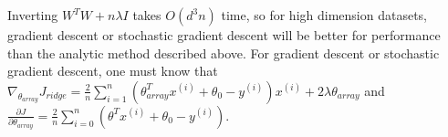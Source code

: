 \documentclass{article}
\begin{document}
    Inverting $W^TW+n\lambda{I}$ takes $O(d^3n)$ time, so for high dimension datasets, gradient descent or stochastic gradient descent will be better for performance than the analytic method described above. For gradient descent or stochastic gradient descent, one must know that $\nabla_{\theta_{array}}J_{ridge}=\frac{2}{n}\sum_{i=1}^n{(\theta_{array}^Tx^{(i)}+\theta_0-y^{(i)})x^{(i)}}+2\lambda{\theta_{array}}$ and $\frac{\partial{J}}{\partial\theta_{array}}=\frac{2}{n}{\sum_{i=0}^{n}}(\theta^Tx^{(i)}+\theta_0-y^{(i)})$.
    
    
    
    
\end{document}
